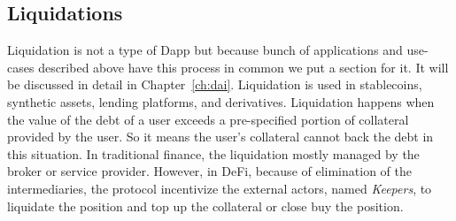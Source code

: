 \subsection{Liquidations} 
Liquidation is not a type of Dapp but because bunch of applications and use-cases described above have this process in common we put a section for it. It will be discussed in detail in Chapter~\ref{ch:dai}. Liquidation is used in stablecoins, synthetic assets, lending platforms, and derivatives. Liquidation happens when the value of the debt of a user exceeds a pre-specified portion of collateral provided by the user. So it means the user's collateral cannot back the debt in this situation. In traditional finance, the liquidation mostly managed by the broker or service provider. However, in DeFi, because of elimination of the intermediaries, the protocol incentivize the external actors, named \textit{Keepers}, to liquidate the position and top up the collateral or close buy the position.